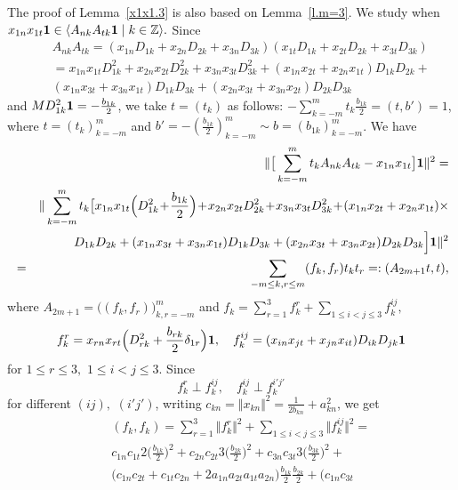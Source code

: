 \documentclass[preprint,12pt]{elsarticle}
\numberwithin{equation}{section}
\begin{document}
\begin{pf}The proof of  Lemma~\ref{x1x1.3} is also based on Lemma~\ref{l.m=3}. 
We study when
$
x_{1n}x_{1t}{\bf 1}\in\langle A_{nk}A_{tk}{\bf 1}\mid k\in{\mathbb
Z}\rangle.
$
Since
\begin{eqnarray*}
&&A_{nk}A_{tk}=(x_{1n}D_{1k}+x_{2n}D_{2k}+x_{3n}D_{3k})(x_{1t}D_{1k}+x_{2t}D_{2k}+x_{3t}D_{3k})\\
&&=x_{1n}x_{1t}D_{1k}^2+
x_{2n}x_{2t}D_{2k}^2+
x_{3n}x_{3t}D_{3k}^2+
(x_{1n}x_{2t}+x_{2n}x_{1t})D_{1k}D_{2k}+
\\
&&
(x_{1n}x_{3t}+x_{3n}x_{1t})D_{1k}D_{3k}+
(x_{2n}x_{3t}+x_{3n}x_{2t})D_{2k}D_{3k}
\end{eqnarray*}
%
and $MD_{1k}^2{\bf 1}=-\frac{b_{1k}}{2}$, we take $t=(t_k)$ as follows:
$-\sum_{k=-m}^mt_k\frac{b_{1k}}{2}=(t,b')=1$, where $t=(t_k)_{k=-m}^m$ and $b'=-(\frac{b_{1k}}{2})_{k=-m}^m\sim b=(b_{1k})_{k=-m}^m$. 
We have
\begin{eqnarray*}
&&\Vert \big[\sum_{k=-m}^mt_kA_{nk}A_{tk}-x_{1n}x_{1t}\big]{\bf
1}\Vert^2=\\
&&\Vert \sum_{k=-m}^mt_k\big[
x_{1n}x_{1t}\Big(D_{1k}^2\!+\!\frac{b_{1k}}{2}\Big)\!+\!
x_{2n}x_{2t}D_{2k}^2\!+\!
x_{3n}x_{3t}D_{3k}^2\!+\!
(x_{1n}x_{2t}+x_{2n}x_{1t})\times
\\
&&
 D_{1k}D_{2k}+(x_{1n}x_{3t}+x_{3n}x_{1t})D_{1k}D_{3k}+
(x_{2n}x_{3t}+x_{3n}x_{2t})D_{2k}D_{3k}
\Big]{\bf 1}\Vert^2\\
&=&\sum_{-m\leq k,r\leq m}(f_k,f_r)t_kt_r=:(A_{2m+1}t,t),
\end{eqnarray*}
where $A_{2m+1}=\big((f_k,f_r)\big)_{k,r=-m}^m$ and
%
$f_k=\sum_{r=1}^3f_k^r+\sum_{1\leq i<j\leq 3}f_k^{ij},$
\begin{equation}
\label{f_k(r),f_k(ij)}
f_k^r= x_{rn}x_{rt}\Big(D_{rk}^2+\frac{b_{rk}}{2}\delta_{1r}\Big){\bf 1},\quad
f_k^{ij}=(x_{in}x_{jt}+x_{jn}x_{it})D_{ik}D_{jk}{\bf 1}
\end{equation}
for $1\leq r\leq 3,\,\, 1\leq i<j\leq 3$.
Since 
$$
f_k^r\perp f_k^{ij},\quad 
f_k^{ij}\perp f_k^{i'j'}
$$
for different $(ij),\,\,(i'j')$,
writing $c_{kn}=\Vert x_{kn}\Vert^2=\frac{1}{2b_{kn}}+a_{kn}^2$,  we get
\begin{eqnarray*}
&&(f_k,f_k)=\sum_{r=1}^3\Vert f_k^r\Vert^2+\sum_{1\leq i<j\leq 3}\Vert f_k^{ij}\Vert^2=
\\
&&
c_{1n}c_{1t}2\Big(\frac{b_{1k}}{2}\Big)^2+
c_{2n}c_{2t}3\Big(\frac{b_{2k}}{2}\Big)^2+
c_{3n}c_{3t}3\Big(\frac{b_{3k}}{2}\Big)^2+
\\
&&
\big(c_{1n}c_{2t}+c_{1t}c_{2n}+2a_{1n}a_{2t}a_{1t}a_{2n}\big)\frac{b_{1k}}{2}\frac{b_{2k}}{2}+\big(c_{1n}c_{3t}

\end{eqnarray*}
\end{pf}
\end{document}
